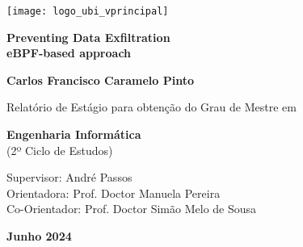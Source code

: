 \begin{titlepage}
	\begin{center}

		\begin{flushright}
			\texttt{[image: logo\_ubi\_vprincipal]}\\


			\vspace{7.6cm}

			\rostotitulo \textbf{Preventing Data Exfiltration} \\
			\rostosubtit \textbf{eBPF-based approach}\\

			\vspace{1.8cm}

			\rostonomes \textbf{Carlos Francisco Caramelo Pinto}\\

			\vspace{1.4cm}


			\rostooutros Relatório de Estágio para obtenção do Grau de Mestre em

			\rostonomes \textbf{Engenharia Informática}\\
			\rostooutros (2º Ciclo de Estudos)\\

			\vspace{3.3cm}

			\rostooutros Supervisor: André Passos\\
			\rostooutros Orientadora: Prof. Doctor Manuela Pereira\\
			\rostooutros Co-Orientador: Prof. Doctor Simão Melo de Sousa

			\vspace{1.4cm}

			\rostooutros \textbf{Junho 2024}

		\end{flushright}

	\end{center}
\end{titlepage}
